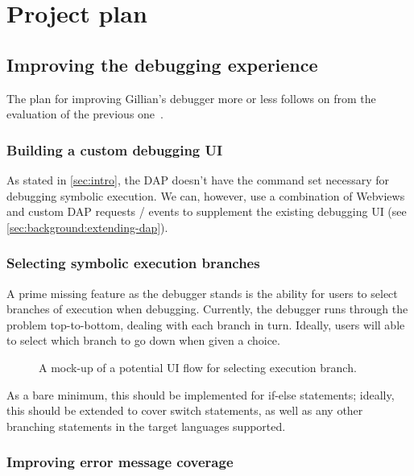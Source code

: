 \chapter{Project plan}
\label{cha:plan}

\section{Improving the debugging experience}

The plan for improving Gillian's debugger more or less follows on from the evaluation of the previous one~\cite{gillian-debugging-2021}.

\subsection{Building a custom debugging UI}

As stated in \autoref{sec:intro}, the DAP doesn't have the command
set necessary for debugging symbolic execution. We can, however, use a
combination of Webviews and custom DAP requests / events to supplement the
existing debugging UI (see \autoref{sec:background:extending-dap}).

\subsection{Selecting symbolic execution branches}

A prime missing feature as the debugger stands is the ability for users to
select branches of execution when debugging. Currently, the debugger runs
through the problem top-to-bottom, dealing with each branch in turn. Ideally,
users will able to select which branch to go down when given a choice.

\begin{figure}
  \noindent
  \caption{A mock-up of a potential UI flow for selecting execution branch.}
  \label{fig:branch-selection-mockup}
\end{figure}

As a bare minimum, this should be implemented for if-else statements; ideally,
this should be extended to cover switch statements, as well as any other
branching statements in the target languages supported.



\subsection{Improving error message coverage}

